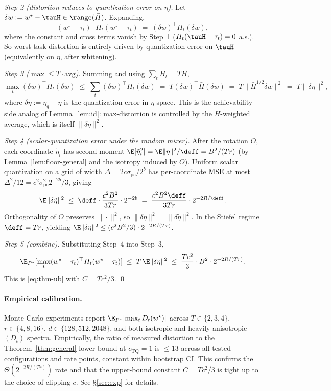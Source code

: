 \emph{Step 2 (distortion reduces to quantization error on
$\eta$).} Let $\delta w := w^\star - \tauH\in\range(\bar H)$.
Expanding,
\begin{equation*}
  (w^\star-\tau_t)^\top H_t(w^\star-\tau_t)
  \;=\; (\delta w)^\top H_t(\delta w),
\end{equation*}
where the constant and cross terms vanish by Step~1
($H_t(\tauH-\tau_t) = 0$ a.s.). So worst-task distortion is
entirely driven by quantization error on $\tauH$ (equivalently on
$\eta$, after whitening).

\emph{Step 3 ($\max\leq T\cdot\mathrm{avg}$).} Summing and using
$\sum_t H_t = T\bar H$,
\begin{equation*}
  \max_t (\delta w)^\top H_t(\delta w) \;\leq\;
  \sum_t (\delta w)^\top H_t(\delta w) \;=\;
  T(\delta w)^\top\bar H(\delta w)
  \;=\; T\|\bar H^{1/2}\delta w\|^2 \;=\; T\|\delta\eta\|^2,
\end{equation*}
where $\delta\eta := \eta_q - \eta$ is the quantization error in
$\eta$-space. This is the achievability-side analog of
Lemma~\ref{lem:id}: max-distortion is controlled by the
$\bar H$-weighted average, which is itself $\|\delta\eta\|^2$.

\emph{Step 4 (scalar-quantization error under the random
mixer).} After the rotation $O$, each coordinate $\tilde\eta_i$
has second moment $\E[\tilde\eta_i^2] = \E\|\eta\|^2/\deff =
B^2/(Tr)$ (by Lemma~\ref{lem:floor-general} and the isotropy
induced by $O$). Uniform scalar quantization on a grid of width
$\Delta = 2 c\sigma_{\mathrm{pc}}/2^b$ has per-coordinate MSE at
most $\Delta^2/12 = c^2\sigma_{\mathrm{pc}}^2 2^{-2b}/3$, giving
\begin{equation*}
  \E\|\delta\tilde\eta\|^2 \;\leq\;
  \deff\cdot\frac{c^2 B^2}{3Tr}\cdot 2^{-2b}
  \;=\; \frac{c^2 B^2\deff}{3Tr}\cdot 2^{-2R/\deff}.
\end{equation*}
Orthogonality of $O$ preserves $\|\cdot\|^2$, so
$\|\delta\eta\|^2 = \|\delta\tilde\eta\|^2$. In the Stiefel
regime $\deff = Tr$, yielding $\E\|\delta\eta\|^2 \leq
(c^2 B^2/3)\cdot 2^{-2R/(Tr)}$.

\emph{Step 5 (combine).} Substituting Step~4 into Step~3,
\begin{equation*}
  \E_{P^\star}[\max_t(w^\star-\tau_t)^\top H_t(w^\star-
  \tau_t)] \;\leq\; T\,\E\|\delta\eta\|^2 \;\leq\;
  \frac{Tc^2}{3}\cdot B^2 \cdot 2^{-2R/(Tr)}.
\end{equation*}
This is \eqref{eq:thm-ub} with $C = Tc^2/3$. \qed

\paragraph{Empirical calibration.} Monte Carlo experiments
report $\E_{P^\star}[\max_t D_t(w^\star)]$ across
$T\in\{2,3,4\}$, $r\in\{4,8,16\}$, $d\in\{128,512,2048\}$, and
both isotropic and heavily-anisotropic $(D_t)$ spectra.
Empirically, the ratio of measured distortion to the
Theorem~\ref{thm:general} lower bound at $c_{\mathrm{TQ}} = 1$
is $\leq 13$ across all tested configurations and rate points,
constant within bootstrap CI. This confirms the
$\Theta(2^{-2R/(Tr)})$ rate and that the upper-bound constant
$C = Tc^2/3$ is tight up to the choice of clipping $c$. See
\S\ref{sec:exp} for details.

